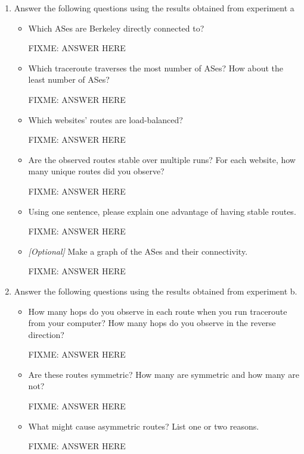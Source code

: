 \documentclass[10pt]{article}
\begin{document}
\begin{enumerate}

\item Answer the following questions using the results obtained from experiment a

\begin{itemize}

\item Which ASes are Berkeley directly connected to?

FIXME: ANSWER HERE

\item Which traceroute traverses the most number of ASes? How about the least number of ASes?

FIXME: ANSWER HERE

\item Which websites' routes are load-balanced?

FIXME: ANSWER HERE

\item Are the observed routes stable over multiple runs? For each website, how many unique routes did you observe?

FIXME: ANSWER HERE

\item Using one sentence, please explain one advantage of having stable routes.

FIXME: ANSWER HERE

\item \emph{[Optional]} Make a graph of the ASes and their connectivity.

FIXME: ANSWER HERE

\end{itemize}

\item Answer the following questions using the results obtained from experiment b.

\begin{itemize}

\item How many hops do you observe in each route when you run traceroute from your computer? How many hops do you observe in the reverse direction?

FIXME: ANSWER HERE

\item Are these routes symmetric? How many are symmetric and how many are not?

FIXME: ANSWER HERE

\item What might cause asymmetric routes? List one or two reasons.

FIXME: ANSWER HERE

\end{itemize}
\end{enumerate}
\end{document}
